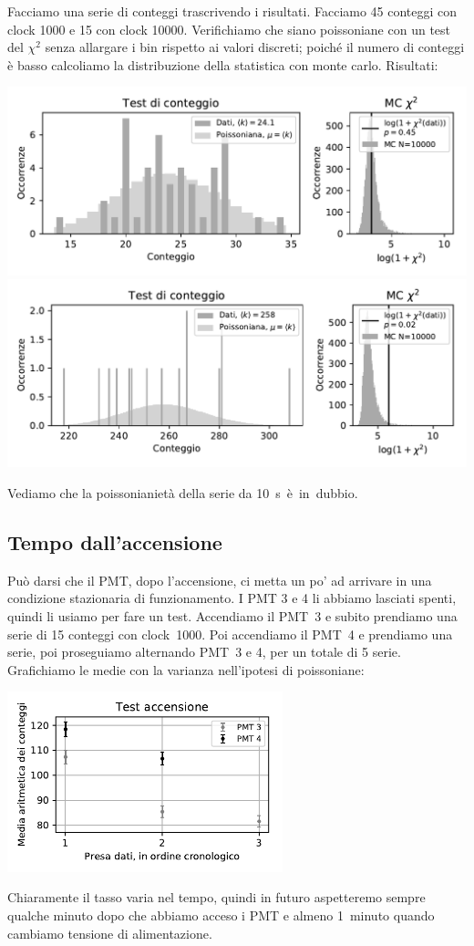 \documentclass[a4paper]{article}
\begin{document}
Facciamo una serie di conteggi trascrivendo i risultati.
Facciamo 45 conteggi con clock 1000 e 15 con clock \num{10000}.
Verifichiamo che siano poissoniane con un test del $\chi^2$ senza allargare i bin rispetto ai valori discreti;
poiché il numero di conteggi è basso calcoliamo la distribuzione della statistica con monte carlo.
Risultati:
\begin{center}
	\includegraphics[width=\textwidth]{fig6a} \\
	\includegraphics[width=\textwidth]{fig6b}
\end{center}
Vediamo che la poissonianietà della serie da \SI{10}s è in dubbio.

\subsection*{Tempo dall'accensione}

Può darsi che il PMT, dopo l'accensione, ci metta un po' ad arrivare in una condizione stazionaria di funzionamento.
I PMT 3 e 4 li abbiamo lasciati spenti, quindi li usiamo per fare un test.
Accendiamo il PMT~3 e subito prendiamo una serie di 15 conteggi con clock~1000.
Poi accendiamo il PMT~4 e prendiamo una serie, poi proseguiamo alternando PMT~3 e 4,
per un totale di 5 serie. Grafichiamo le medie con la varianza nell'ipotesi di poissoniane:
\begin{center}
	\includegraphics[width=8cm]{fig6c}
\end{center}
Chiaramente il tasso varia nel tempo, quindi in futuro aspetteremo sempre qualche minuto dopo che abbiamo acceso i PMT e almeno 1~minuto quando cambiamo tensione di alimentazione.
\end{document}
